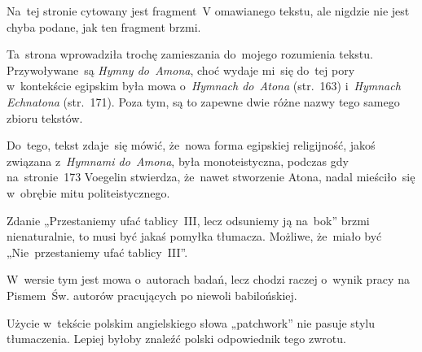 \documentclass[a4paper,11pt]{article}
\begin{document}
\vspace{\spaceFour}





\noindent
{} Na~tej stronie cytowany jest fragment~V omawianego
tekstu, ale nigdzie nie jest chyba podane, jak ten fragment brzmi.

\vspace{\spaceFour}





\noindent
{} Ta~strona wprowadziła trochę zamieszania do~mojego
rozumienia tekstu. Przywoływane~są \textit{Hymny do~Amona}, choć wydaje
mi~się do~tej pory w~kontekście egipskim była mowa o~\textit{Hymnach
  do~Atona} (str.~163) i~\textit{Hymnach Echnatona} (str.~171). Poza
tym, są to zapewne dwie różne nazwy tego samego zbioru tekstów.

Do~tego, tekst zdaje~się mówić, że~nowa forma egipskiej religijność,
jakoś związana z~\textit{Hymnami do~Amona}, była monoteistyczna, podczas
gdy na~stronie~173 Voegelin stwierdza, że~nawet stworzenie Atona,
nadal mieściło~się w~obrębie mitu politeistycznego.

\vspace{\spaceFour}





\noindent
{} Zdanie „Przestaniemy ufać tablicy~III, lecz
odsuniemy ją na~bok” brzmi nienaturalnie, to musi być jakaś pomyłka
tłumacza. Możliwe, że~miało być „Nie~przestaniemy ufać tablicy~III”.

\vspace{\spaceFour}





\noindent
{} W~wersie tym jest mowa o~autorach badań, lecz
chodzi raczej o~wynik pracy na Pismem~Św. autorów pracujących po
niewoli babilońskiej.

\vspace{\spaceFour}





\noindent
{} Użycie w~tekście polskim angielskiego słowa
„patchwork” nie pasuje stylu tłumaczenia. Lepiej byłoby znaleźć
polski odpowiednik tego zwrotu.

\vspace{\spaceFour}
\end{document}
